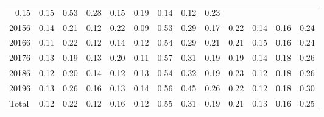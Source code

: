 \begin{table}[!h]
\begin{tabular}{lllllllllllll}
  \multicolumn{1}{r}{0.15} &
  \multicolumn{1}{r}{0.15} &
  \multicolumn{1}{r}{0.53} &
  \multicolumn{1}{r}{0.28} &
  \multicolumn{1}{r}{0.15} &
  \multicolumn{1}{r}{0.19} &
  \multicolumn{1}{r}{0.14} &
  \multicolumn{1}{r}{0.12} &
  \multicolumn{1}{r}{0.23} \\
\multicolumn{1}{l}{\hspace{1em}20156} &
  \multicolumn{1}{|r}{0.14} &
  \multicolumn{1}{r}{0.21} &
  \multicolumn{1}{r}{0.12} &
  \multicolumn{1}{r}{0.22} &
  \multicolumn{1}{r}{0.09} &
  \multicolumn{1}{r}{0.53} &
  \multicolumn{1}{r}{0.29} &
  \multicolumn{1}{r}{0.17} &
  \multicolumn{1}{r}{0.22} &
  \multicolumn{1}{r}{0.14} &
  \multicolumn{1}{r}{0.16} &
  \multicolumn{1}{r}{0.24} \\
\multicolumn{1}{l}{\hspace{1em}20166} &
  \multicolumn{1}{|r}{0.11} &
  \multicolumn{1}{r}{0.22} &
  \multicolumn{1}{r}{0.12} &
  \multicolumn{1}{r}{0.14} &
  \multicolumn{1}{r}{0.12} &
  \multicolumn{1}{r}{0.54} &
  \multicolumn{1}{r}{0.29} &
  \multicolumn{1}{r}{0.21} &
  \multicolumn{1}{r}{0.21} &
  \multicolumn{1}{r}{0.15} &
  \multicolumn{1}{r}{0.16} &
  \multicolumn{1}{r}{0.24} \\
\multicolumn{1}{l}{\hspace{1em}20176} &
  \multicolumn{1}{|r}{0.13} &
  \multicolumn{1}{r}{0.19} &
  \multicolumn{1}{r}{0.13} &
  \multicolumn{1}{r}{0.20} &
  \multicolumn{1}{r}{0.11} &
  \multicolumn{1}{r}{0.57} &
  \multicolumn{1}{r}{0.31} &
  \multicolumn{1}{r}{0.19} &
  \multicolumn{1}{r}{0.19} &
  \multicolumn{1}{r}{0.14} &
  \multicolumn{1}{r}{0.18} &
  \multicolumn{1}{r}{0.26} \\
\multicolumn{1}{l}{\hspace{1em}20186} &
  \multicolumn{1}{|r}{0.12} &
  \multicolumn{1}{r}{0.20} &
  \multicolumn{1}{r}{0.14} &
  \multicolumn{1}{r}{0.12} &
  \multicolumn{1}{r}{0.13} &
  \multicolumn{1}{r}{0.54} &
  \multicolumn{1}{r}{0.32} &
  \multicolumn{1}{r}{0.19} &
  \multicolumn{1}{r}{0.23} &
  \multicolumn{1}{r}{0.12} &
  \multicolumn{1}{r}{0.18} &
  \multicolumn{1}{r}{0.26} \\
\multicolumn{1}{l}{\hspace{1em}20196} &
  \multicolumn{1}{|r}{0.13} &
  \multicolumn{1}{r}{0.26} &
  \multicolumn{1}{r}{0.16} &
  \multicolumn{1}{r}{0.13} &
  \multicolumn{1}{r}{0.14} &
  \multicolumn{1}{r}{0.56} &
  \multicolumn{1}{r}{0.45} &
  \multicolumn{1}{r}{0.26} &
  \multicolumn{1}{r}{0.22} &
  \multicolumn{1}{r}{0.12} &
  \multicolumn{1}{r}{0.18} &
  \multicolumn{1}{r}{0.30} \\
\multicolumn{1}{l}{\hspace{1em}Total} &
  \multicolumn{1}{|r}{0.12} &
  \multicolumn{1}{r}{0.22} &
  \multicolumn{1}{r}{0.12} &
  \multicolumn{1}{r}{0.16} &
  \multicolumn{1}{r}{0.12} &
  \multicolumn{1}{r}{0.55} &
  \multicolumn{1}{r}{0.31} &
  \multicolumn{1}{r}{0.19} &
  \multicolumn{1}{r}{0.21} &
  \multicolumn{1}{r}{0.13} &
  \multicolumn{1}{r}{0.16} &
  \multicolumn{1}{r}{0.25} \\
\cline{1-13}
\end{tabular}
\end{table}
